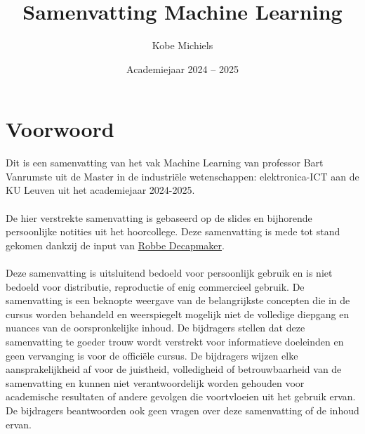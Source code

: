 \documentclass[kul]{kulakarticle} %
\title{Samenvatting Machine Learning}
\author{Kobe Michiels}
\date{Academiejaar 2024 -- 2025}
\begin{document}
	
	\maketitle
	
	\section*{Voorwoord}
	
	Dit is een samenvatting van het vak Machine Learning van professor Bart Vanrumste uit de Master in de industriële wetenschappen: elektronica-ICT aan de KU Leuven uit het academiejaar 2024-2025.  
	\\\\
	De hier verstrekte samenvatting is gebaseerd op de slides en bijhorende persoonlijke notities uit het hoorcollege. Deze samenvatting is mede tot stand gekomen dankzij de input van \href{https://github.com/debber1}{Robbe Decapmaker}.
	\\\\
	Deze samenvatting is uitsluitend bedoeld voor persoonlijk gebruik en is niet bedoeld voor distributie, reproductie of enig commercieel gebruik. De samenvatting is een beknopte weergave van de belangrijkste concepten die in de cursus worden behandeld en weerspiegelt mogelijk niet de volledige diepgang en nuances van de oorspronkelijke inhoud. De bijdragers stellen dat deze samenvatting te goeder trouw wordt verstrekt voor informatieve doeleinden en geen vervanging is voor de officiële cursus. De bijdragers wijzen elke aansprakelijkheid af voor de juistheid, volledigheid of betrouwbaarheid van de samenvatting en kunnen niet verantwoordelijk worden gehouden voor academische resultaten of andere gevolgen die voortvloeien uit het gebruik ervan. De bijdragers beantwoorden ook geen vragen over deze samenvatting of de inhoud ervan.
	
	\setcounter{tocdepth}{2}
	\tableofcontents
	
		\newpage
		
		
		
		
		
		
		
		
\end{document}
